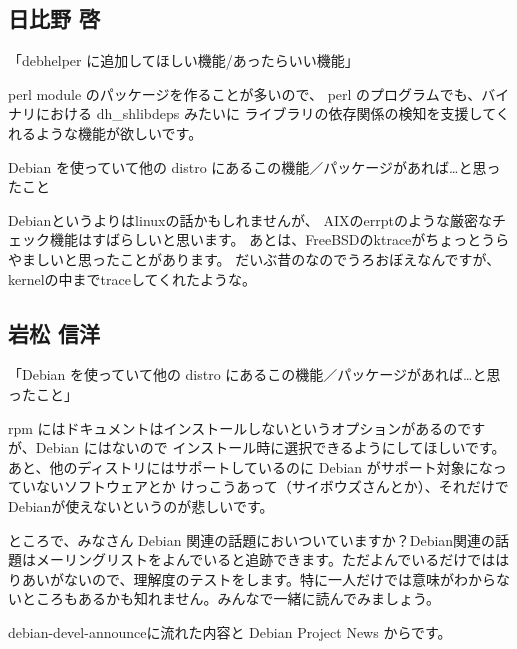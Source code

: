 \documentclass[mingoth,a4paper]{jsarticle}
\begin{document}
\subsection{日比野 啓}

「debhelper に追加してほしい機能/あったらいい機能」

perl module のパッケージを作ることが多いので、
perl のプログラムでも、バイナリにおける dh\_{}shlibdeps みたいに
ライブラリの依存関係の検知を支援してくれるような機能が欲しいです。

Debian を使っていて他の distro にあるこの機能／パッケージがあれば…と思ったこと

Debianというよりはlinuxの話かもしれませんが、
AIXのerrptのような厳密なチェック機能はすばらしいと思います。
あとは、FreeBSDのktraceがちょっとうらやましいと思ったことがあります。
だいぶ昔のなのでうろおぼえなんですが、kernelの中までtraceしてくれたような。

\subsection{岩松 信洋}

「Debian を使っていて他の distro にあるこの機能／パッケージがあれば…と思ったこと」

rpm にはドキュメントはインストールしないというオプションがあるのですが、Debian にはないので
インストール時に選択できるようにしてほしいです。
あと、他のディストリにはサポートしているのに Debian がサポート対象になっていないソフトウェアとか
けっこうあって（サイボウズさんとか）、それだけでDebianが使えないというのが悲しいです。


ところで、みなさん Debian 関連の話題においついていますか？Debian関連の話
題はメーリングリストをよんでいると追跡できます。ただよんでいるだけではは
りあいがないので、理解度のテストをします。特に一人だけでは意味がわからな
いところもあるかも知れません。みんなで一緒に読んでみましょう。

debian-devel-announceに流れた内容と Debian Project News からです。
\end{document}
